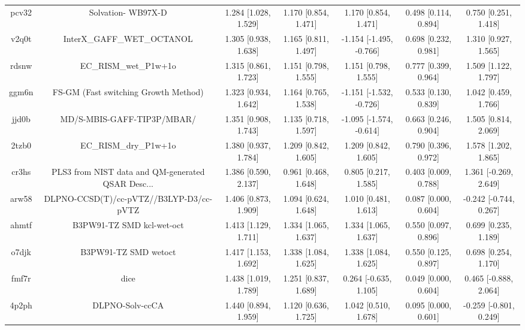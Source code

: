 \documentclass{article}
\begin{document}
\begin{center}
\begin{longtable}{|ccccccc|}
 pcv32 &                                 Solvation- WB97X-D &  1.284 [1.028, 1.529] &  1.170 [0.854, 1.471] &     1.170 [0.854, 1.471] &  0.498 [0.114, 0.894] &    0.750 [0.251, 1.418] \\
 v2q0t &                         InterX\_GAFF\_WET\_OCTANOL &  1.305 [0.938, 1.638] &  1.165 [0.811, 1.497] &  -1.154 [-1.495, -0.766] &  0.698 [0.232, 0.981] &    1.310 [0.927, 1.565] \\
 rdsnw &                              EC\_RISM\_wet\_P1w+1o &  1.315 [0.861, 1.723] &  1.151 [0.798, 1.555] &     1.151 [0.798, 1.555] &  0.777 [0.399, 0.964] &    1.509 [1.122, 1.797] \\
 ggm6n &               FS-GM (Fast switching Growth Method) &  1.323 [0.934, 1.642] &  1.164 [0.765, 1.538] &  -1.151 [-1.532, -0.726] &  0.533 [0.130, 0.839] &    1.042 [0.459, 1.766] \\
 jjd0b &                         MD/S-MBIS-GAFF-TIP3P/MBAR/ &  1.351 [0.908, 1.743] &  1.135 [0.718, 1.597] &  -1.095 [-1.574, -0.614] &  0.663 [0.246, 0.904] &    1.505 [0.814, 2.069] \\
 2tzb0 &                              EC\_RISM\_dry\_P1w+1o &  1.380 [0.937, 1.784] &  1.209 [0.842, 1.605] &     1.209 [0.842, 1.605] &  0.790 [0.396, 0.972] &    1.578 [1.202, 1.865] \\
 cr3hs &  PLS3 from NIST data and QM-generated QSAR Desc... &  1.386 [0.590, 2.137] &  0.961 [0.468, 1.648] &     0.805 [0.217, 1.585] &  0.403 [0.009, 0.788] &   1.361 [-0.269, 2.649] \\
 arw58 &            DLPNO-CCSD(T)/cc-pVTZ//B3LYP-D3/cc-pVTZ &  1.406 [0.873, 1.909] &  1.094 [0.624, 1.648] &     1.010 [0.481, 1.613] &  0.087 [0.000, 0.604] &  -0.242 [-0.744, 0.267] \\
 ahmtf &                          B3PW91-TZ SMD kcl-wet-oct &  1.413 [1.129, 1.711] &  1.334 [1.065, 1.637] &     1.334 [1.065, 1.637] &  0.550 [0.097, 0.896] &    0.699 [0.235, 1.189] \\
 o7djk &                               B3PW91-TZ SMD wetoct &  1.417 [1.153, 1.692] &  1.338 [1.084, 1.625] &     1.338 [1.084, 1.625] &  0.550 [0.125, 0.897] &    0.698 [0.254, 1.170] \\
 fmf7r &                                               dice &  1.438 [1.019, 1.789] &  1.251 [0.837, 1.689] &    0.264 [-0.635, 1.105] &  0.049 [0.000, 0.604] &   0.465 [-0.888, 2.064] \\
 4p2ph &                                    DLPNO-Solv-ccCA &  1.440 [0.894, 1.959] &  1.120 [0.636, 1.725] &     1.042 [0.510, 1.678] &  0.095 [0.000, 0.601] &  -0.259 [-0.801, 0.249] \\

\end{longtable}
\end{center}
\end{document}
